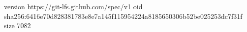 version https://git-lfs.github.com/spec/v1
oid sha256:6416e70d828381783e8e7a145f115954224a8185650306b52be025253dc7f31f
size 7082
